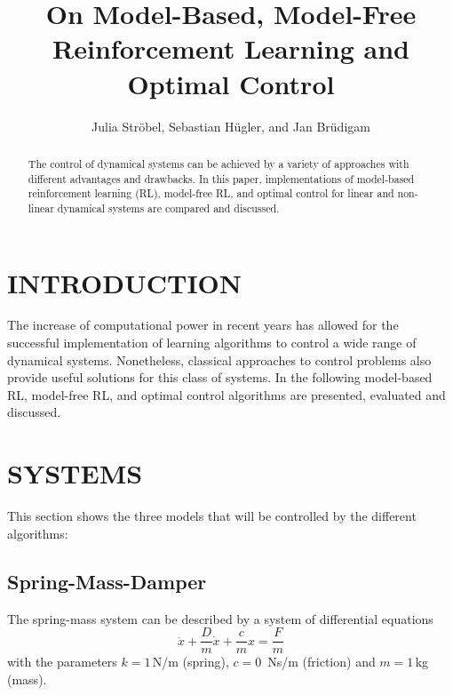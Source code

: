 \documentclass[letterpaper, 10 pt, conference]{ieeeconf}  %
\title{\LARGE \bf
On Model-Based, Model-Free Reinforcement Learning and Optimal Control
}
\author{Julia Str\"obel, Sebastian H\"ugler, and Jan Br\"udigam}
\begin{document}
\maketitle
\thispagestyle{empty}
\pagestyle{empty}
\setlength{\belowcaptionskip}{-5pt}

\begin{abstract}

The control of dynamical systems can be achieved by a variety of approaches with different advantages and drawbacks. In this paper, implementations of model-based reinforcement learning (RL), model-free RL, and optimal control for linear and non-linear dynamical systems are compared and discussed.

\end{abstract}


\section{INTRODUCTION}

The increase of computational power in recent years has allowed for the successful implementation of learning algorithms to control a wide range of dynamical systems. Nonetheless, classical approaches to control problems also provide useful solutions for this class of systems. In the following model-based RL, model-free RL, and optimal control algorithms are presented, evaluated and discussed.
\section{SYSTEMS}
This section shows the three models that will be controlled by the different algorithms:
\subsection{Spring-Mass-Damper}
The spring-mass system can be described by a system of differential equations
\begin{equation}
\ddot{x}+\frac{D}{m}\dot{x}+\frac{c}{m}x=\frac{F}{m}
\end{equation}
with the parameters $k=1$\,N/m (spring), $c=0$\, Ns/m (friction) and $m=1$\,kg (mass).
\end{document}
